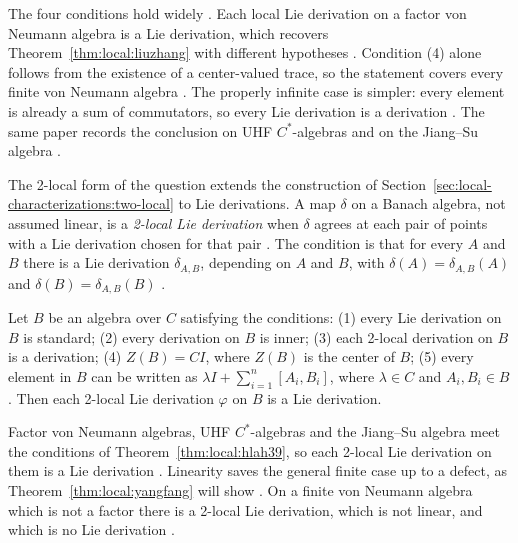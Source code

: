 The four conditions hold widely \cite[pp.~727--728]{HeLiAnHuang2018}. Each
local Lie derivation on a factor von Neumann algebra is a Lie derivation,
which recovers Theorem~\ref{thm:local:liuzhang} with different hypotheses
\cite[Corollary~3.2, p.~727]{HeLiAnHuang2018}. Condition (4) alone follows
from the existence of a center-valued trace, so the statement covers every
finite von Neumann algebra
\cite[Theorem~3.4 and Corollary~3.5, p.~728]{HeLiAnHuang2018}. The
properly infinite case is simpler: every element is already a sum of
commutators, so every Lie derivation is a derivation
\cite[Remark~3.6, p.~728]{HeLiAnHuang2018}. The same paper records the
conclusion on UHF $C^*$-algebras and on the Jiang--Su algebra
\cite[Corollaries~3.7 and~3.8, p.~728]{HeLiAnHuang2018}.

The 2-local form of the question extends the construction of
Section~\ref{sec:local-characterizations:two-local} to Lie derivations. A
map $\delta$ on a
Banach algebra, not assumed linear, is a \emph{2-local Lie derivation}
when $\delta$ agrees at each pair of points with a Lie derivation chosen
for that pair \cite[p.~243]{YangFang2019}. The condition is
that for every $A$ and $B$ there is a Lie derivation
$\delta_{A,B}$, depending on $A$ and $B$, with
$\delta(A)=\delta_{A,B}(A)$ and $\delta(B)=\delta_{A,B}(B)$
\cite[p.~243]{YangFang2019}.

\begin{theorem}\label{thm:local:hlah39}
Let $B$ be an algebra over $C$ satisfying the conditions: (1) every Lie
derivation on $B$ is standard; (2) every derivation on $B$ is inner;
(3) each 2-local derivation on $B$ is a derivation; (4) $Z(B)=CI$, where
$Z(B)$ is the center of $B$; (5) every element in $B$ can be written as
$\lambda I+\sum_{i=1}^{n}[A_i,B_i]$, where $\lambda\in C$ and
$A_i,B_i\in B$. Then each 2-local Lie derivation $\varphi$ on $B$ is a Lie
derivation.
\end{theorem}

Factor von Neumann algebras, UHF $C^*$-algebras and the Jiang--Su algebra
meet the conditions of Theorem~\ref{thm:local:hlah39}, so each 2-local Lie
derivation on them is a Lie derivation
\cite[Corollaries~3.10 to~3.12, p.~729]{HeLiAnHuang2018}. Linearity saves
the general finite case up to a defect, as Theorem~\ref{thm:local:yangfang}
will show \cite[p.~244]{YangFang2019}. On a finite von
Neumann algebra which is not a factor there is a 2-local Lie derivation,
which is not linear, and which is no Lie derivation
\cite[Example~3.13, p.~729]{HeLiAnHuang2018}.

